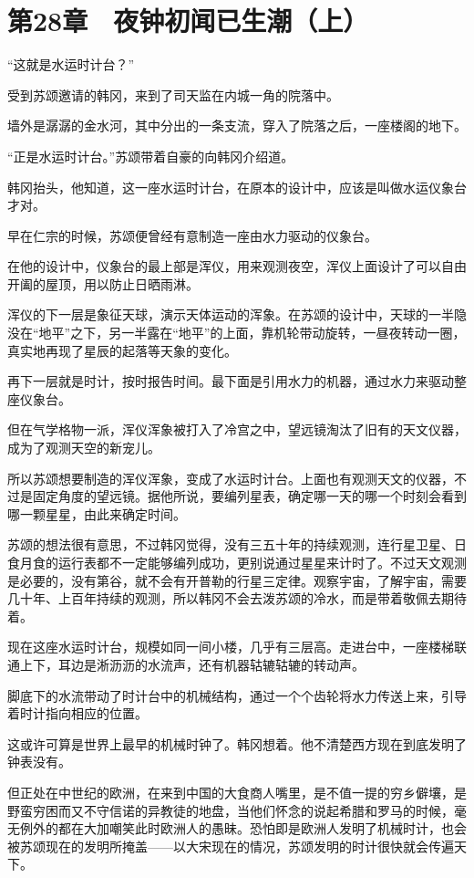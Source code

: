 \section{第28章　夜钟初闻已生潮（上）}

“这就是水运时计台？”

受到苏颂邀请的韩冈，来到了司天监在内城一角的院落中。

墙外是潺潺的金水河，其中分出的一条支流，穿入了院落之后，一座楼阁的地下。

“正是水运时计台。”苏颂带着自豪的向韩冈介绍道。

韩冈抬头，他知道，这一座水运时计台，在原本的设计中，应该是叫做水运仪象台才对。

早在仁宗的时候，苏颂便曾经有意制造一座由水力驱动的仪象台。

在他的设计中，仪象台的最上部是浑仪，用来观测夜空，浑仪上面设计了可以自由开阖的屋顶，用以防止日晒雨淋。

浑仪的下一层是象征天球，演示天体运动的浑象。在苏颂的设计中，天球的一半隐没在“地平”之下，另一半露在“地平”的上面，靠机轮带动旋转，一昼夜转动一圈，真实地再现了星辰的起落等天象的变化。

再下一层就是时计，按时报告时间。最下面是引用水力的机器，通过水力来驱动整座仪象台。

但在气学格物一派，浑仪浑象被打入了冷宫之中，望远镜淘汰了旧有的天文仪器，成为了观测天空的新宠儿。

所以苏颂想要制造的浑仪浑象，变成了水运时计台。上面也有观测天文的仪器，不过是固定角度的望远镜。据他所说，要编列星表，确定哪一天的哪一个时刻会看到哪一颗星星，由此来确定时间。

苏颂的想法很有意思，不过韩冈觉得，没有三五十年的持续观测，连行星卫星、日食月食的运行表都不一定能够编列成功，更别说通过星星来计时了。不过天文观测是必要的，没有第谷，就不会有开普勒的行星三定律。观察宇宙，了解宇宙，需要几十年、上百年持续的观测，所以韩冈不会去泼苏颂的冷水，而是带着敬佩去期待着。

现在这座水运时计台，规模如同一间小楼，几乎有三层高。走进台中，一座楼梯联通上下，耳边是淅沥沥的水流声，还有机器轱辘轱辘的转动声。

脚底下的水流带动了时计台中的机械结构，通过一个个齿轮将水力传送上来，引导着时计指向相应的位置。

这或许可算是世界上最早的机械时钟了。韩冈想着。他不清楚西方现在到底发明了钟表没有。

但正处在中世纪的欧洲，在来到中国的大食商人嘴里，是不值一提的穷乡僻壤，是野蛮穷困而又不守信诺的异教徒的地盘，当他们怀念的说起希腊和罗马的时候，毫无例外的都在大加嘲笑此时欧洲人的愚昧。恐怕即是欧洲人发明了机械时计，也会被苏颂现在的发明所掩盖——以大宋现在的情况，苏颂发明的时计很快就会传遍天下。

